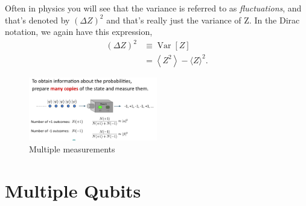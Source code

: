 Often in physics you will see that the variance is referred to as \emph{fluctuations}, and that's denoted by $(\Delta Z)^2$ and that's really just the variance of Z. In the Dirac notation, we again have this expression,
\begin{equation}
\begin{aligned}
(\Delta Z)^{2} & \equiv \operatorname{Var}[Z] \\
&=\left\langle Z^{2}\right\rangle-\langle Z\rangle^{2}.
\end{aligned}
\end{equation}


\begin{figure}[H]
    \centering
    \includegraphics[width=0.5\textwidth]{lesson2/many_copies_machine.pdf}
    
        \caption{Multiple measurements}
    
    \label{fig:many-copies}
\end{figure}


\section{Multiple Qubits}
\label{sec:multi-qubit}

